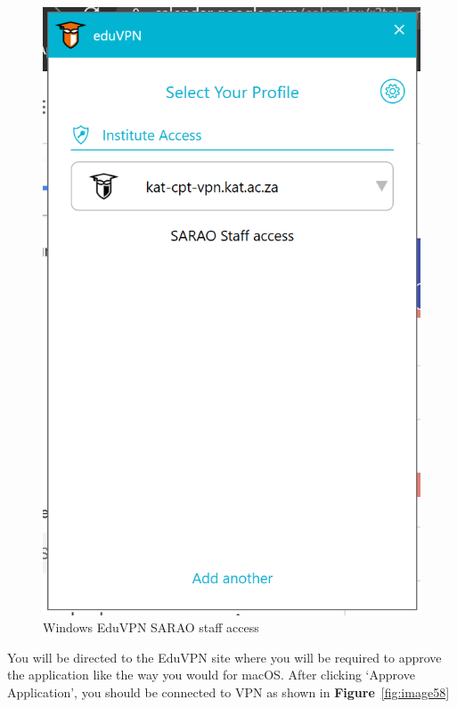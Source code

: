 \begin{figure}[!thb]
	\centering
	\includegraphics[scale=0.25]{Chapters/images/image111.png}
	
	\caption{Windows EduVPN SARAO staff access }
	\label{fig:image111}
\end{figure}
You will be directed to the EduVPN site where you will be required to approve the application like the way you would for macOS. After clicking ‘Approve Application’, you should be connected to VPN as shown in \textbf{Figure}~\ref{fig:image58} 
